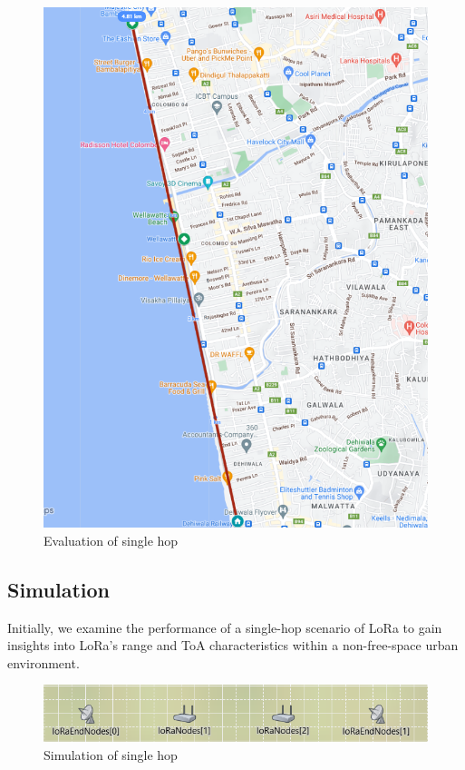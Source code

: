 \begin{figure}[ht!]
    \centering
    \includegraphics[width=0.5\linewidth]{images/Marinedrive.png}
    \caption{Evaluation of single hop}
    \label{fig:single-hop-sim}
\end{figure}


\newpage
\subsection{Simulation}
\label{sec:singlehop_sim}
\hspace{12pt} Initially, we examine the performance of a single-hop scenario of LoRa to gain insights into LoRa's range and \ac{ToA} characteristics within a non-free-space urban environment.

\begin{figure}[htp!]
    \centering
    \includegraphics[width=0.8\linewidth]{images/singlehop-sim.png}
    \caption{Simulation of single hop}
    \label{fig:single-hop-sim}
\end{figure}

